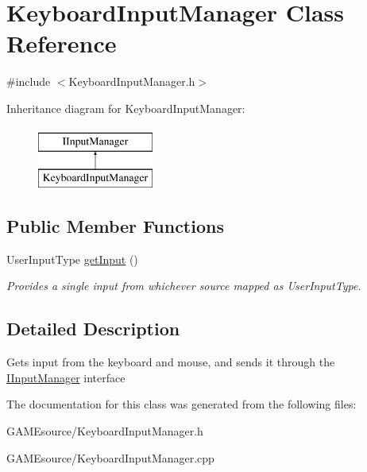 \hypertarget{class_keyboard_input_manager}{}\section{Keyboard\+Input\+Manager Class Reference}
\label{class_keyboard_input_manager}


{\ttfamily \#include $<$Keyboard\+Input\+Manager.\+h$>$}

Inheritance diagram for Keyboard\+Input\+Manager\+:\begin{figure}[H]
\begin{center}
\leavevmode
\includegraphics[height=2.000000cm]{class_keyboard_input_manager}
\end{center}
\end{figure}
\subsection*{Public Member Functions}
\begin{DoxyCompactItemize}
\item 
\mbox{\label{class_keyboard_input_manager_a8cb1844b5ac0c023294a6a2378440c92}} 
User\+Input\+Type \mbox{\hyperlink{class_keyboard_input_manager_a8cb1844b5ac0c023294a6a2378440c92}{get\+Input}} ()
\begin{DoxyCompactList}\small\item\em Provides a single input from whichever source mapped as User\+Input\+Type. \end{DoxyCompactList}\end{DoxyCompactItemize}


\subsection{Detailed Description}
Gets input from the keyboard and mouse, and sends it through the \mbox{\hyperlink{class_i_input_manager}{I\+Input\+Manager}} interface 

The documentation for this class was generated from the following files\+:\begin{DoxyCompactItemize}
\item 
G\+A\+M\+Esource/Keyboard\+Input\+Manager.\+h\item 
G\+A\+M\+Esource/Keyboard\+Input\+Manager.\+cpp\end{DoxyCompactItemize}
